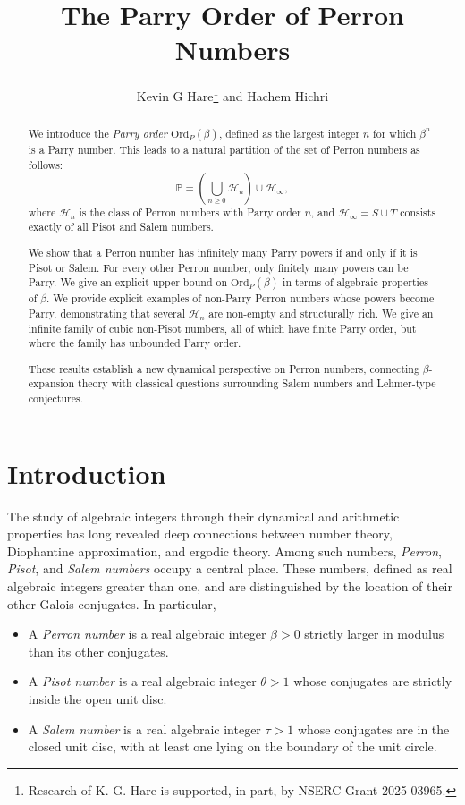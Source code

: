 \documentclass[12pt]{article}
\title{The Parry Order of Perron Numbers}
\author{Kevin G Hare\footnote{Research of K. G. Hare is supported, in part, by NSERC Grant 2025-03965.}  and Hachem Hichri}
\date{}
\theoremstyle{plain}
\theoremstyle{remark}
\newcommand{\OrdP}{\mathrm{Ord}_{P}}
\begin{document}
\maketitle

\begin{abstract}
We introduce the \emph{Parry order} $\OrdP(\beta)$, defined as the largest integer $n$ for which $\beta^n$ is a Parry number. This leads to a natural partition of the set of Perron numbers as follows: 
\[
 \mathbb{P} = \left(\bigcup_{n \ge 0} \mathcal{H}_n\right)\cup \mathcal{H}_\infty,
\]
where $\mathcal{H}_n$ is the class of Perron numbers with Parry order $n$,
and $\mathcal{H}_\infty = S \cup T$ consists exactly of all Pisot and Salem numbers.

We show that a Perron number has infinitely many Parry powers 
if and only if it is Pisot or Salem. For every other Perron number, only finitely many powers can be Parry. 
We give an explicit upper bound on $\OrdP(\beta)$ in terms of algebraic properties of $\beta$. 
We provide explicit examples of non-Parry Perron numbers whose powers become Parry, demonstrating that several $\mathcal{H}_n$ are non-empty and structurally rich.
We give an infinite family of cubic non-Pisot numbers, all of which have finite Parry order, but where the family has unbounded Parry order.

These results establish a new dynamical perspective on Perron numbers, connecting $\beta$-expansion theory with classical questions surrounding Salem numbers and Lehmer-type conjectures.
\end{abstract}

\section*{Introduction}

The study of algebraic integers through their dynamical and arithmetic properties has long revealed deep connections between number theory, Diophantine approximation, and ergodic theory. Among such numbers, \emph{Perron}, \emph{Pisot}, and \emph{Salem numbers} occupy a central place. These numbers, defined as real algebraic integers greater than one, and are distinguished by the location of their other Galois conjugates. 
In particular, 
\begin{itemize}
 \item A \emph{Perron number} is a real algebraic integer $\beta > 0$ strictly larger in modulus than its other conjugates.
 \item A \emph{Pisot number} is a real algebraic integer $\theta > 1$ whose conjugates are strictly inside the open unit disc.
 \item A \emph{Salem number} is a real algebraic integer $\tau > 1$ whose conjugates are in the closed unit disc, with at least one lying on the boundary of the unit circle.
\end{itemize}
\end{document}

